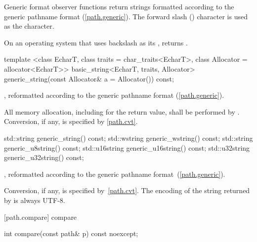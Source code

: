 \pnum
Generic format observer functions return strings formatted according to the
generic pathname format (\ref{path.generic}).
The forward slash () character is used as
the  character.

\pnum
\enterexample On an operating system that uses backslash as
its , 
returns . \exitexample

\begin{itemdecl}
template <class EcharT, class traits = char_traits<EcharT>,
          class Allocator = allocator<EcharT>>
  basic_string<EcharT, traits, Allocator>
    generic_string(const Allocator& a = Allocator()) const;
\end{itemdecl}

\begin{itemdescr}
\pnum
\returns {}, reformatted according to the generic
pathname format (\ref{path.generic}).

\pnum
\remarks All memory allocation, including for the return value, shall
be performed by . Conversion, if any, is specified by
\ref{path.cvt}.
\end{itemdescr}

\begin{itemdecl}
std::string generic_string() const;
std::wstring generic_wstring() const;
std::string generic_u8string() const;
std::u16string generic_u16string() const;
std::u32string generic_u32string() const;
\end{itemdecl}

\begin{itemdescr}
\pnum
\returns {}, reformatted according to the generic
pathname format~(\ref{path.generic}).

\pnum
\remarks Conversion, if any, is specified by~\ref{path.cvt}.
The encoding of the string returned by  is always
UTF-8.
\end{itemdescr}

[path.compare]{ compare}

\begin{itemdecl}
int compare(const path& p) const noexcept;
\end{itemdecl}

